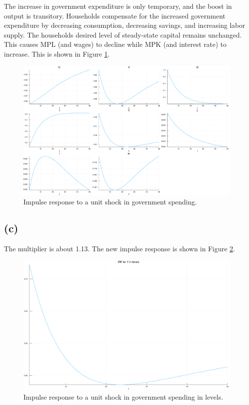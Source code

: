 \documentclass[11pt]{amsart}
\begin{document}
	The increase in government expenditure is only temporary, and the boost in output is transitory. Households compensate for the increased government expenditure by decreasing consumption, decreasing savings, and increasing labor supply. The households desired level of steady-state capital remains unchanged. This causes MPL (and wages) to decline while MPK (and interest rate) to increase.
	This is shown in Figure \ref{5b}.
	\begin{figure}[htbp]
\begin{center}
\includegraphics[width=\textwidth]{Ken/output/IRF_b_plot.pdf}
\caption{Impulse response to a unit shock in government spending.}
\label{5b}
\end{center}
\end{figure}


\subsection*{(c)}
	
	The multiplier is about 1.13. The new impulse response is shown in Figure \ref{5c}.
	\begin{figure}[htbp]
\begin{center}
\includegraphics[width=\textwidth]{Ken/output/IRF_c_plot.pdf}
\caption{Impulse response to a unit shock in government spending in levels.}
\label{5c}
\end{center}
\end{figure}
\end{document}
